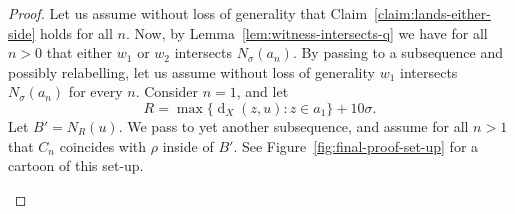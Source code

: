 \documentclass[11pt,a4paper]{amsart}
\DeclareMathOperator{\dist}{d}
\theoremstyle{definition}
\begin{document}
\begin{proof}
    Let us assume without loss of generality that Claim~\ref{claim:lands-either-side} holds for all $n$. 
    Now, by Lemma~\ref{lem:witness-intersects-q} we have for all $n> 0$ that either $w_1$ or $w_2$ intersects $N_\sigma(a_n)$. By passing to a subsequence and possibly relabelling, let us assume without loss of generality $w_1$ intersects $N_{\sigma}(a_n)$ for every $n$. 
    Consider $n = 1$, and let
    $$
    R = \max \{\dist_X(z, u) : z \in a_1\} + 10\sigma. 
    $$
    Let $B' = N_R(u)$. We pass to yet another subsequence, and assume for all $n > 1$ that $C_n$ coincides with $\rho$ inside of $B'$. See Figure~\ref{fig:final-proof-set-up} for a cartoon of this set-up. 

    \begin{figure}
        \centering



\begin{tikzpicture}[x=0.75pt,y=0.75pt,yscale=-1,xscale=1]


\end{tikzpicture}
\end{figure}
\end{proof}
\end{document}
